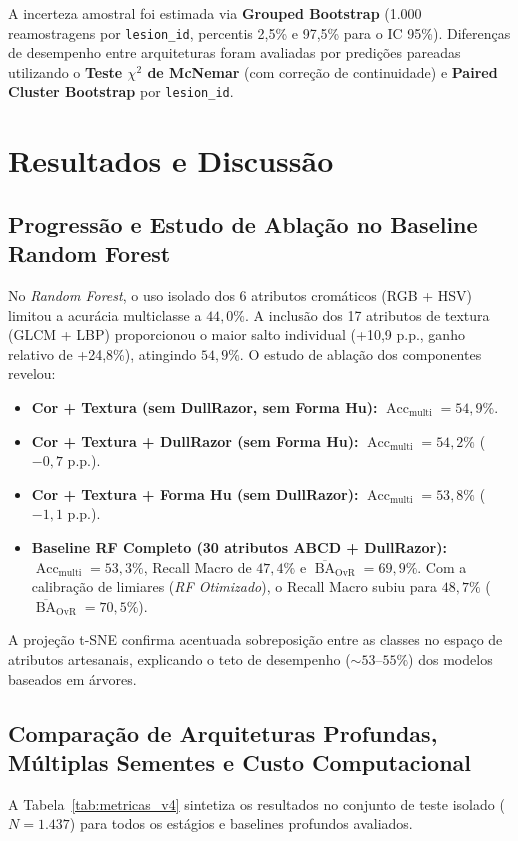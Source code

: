 \documentclass[12pt,a4paper]{article}
\begin{document}
A incerteza amostral foi estimada via \textbf{Grouped Bootstrap} (1.000 reamostragens por \texttt{lesion\_id}, percentis 2,5\% e 97,5\% para o IC 95\%). Diferenças de desempenho entre arquiteturas foram avaliadas por predições pareadas utilizando o \textbf{Teste $\chi^2$ de McNemar} (com correção de continuidade) e \textbf{Paired Cluster Bootstrap} por \texttt{lesion\_id}.

\section{Resultados e Discussão}

\subsection{Progressão e Estudo de Ablação no Baseline Random Forest}
No \textit{Random Forest}, o uso isolado dos 6 atributos cromáticos (RGB + HSV) limitou a acurácia multiclasse a $44{,}0\%$. A inclusão dos 17 atributos de textura (GLCM + LBP) proporcionou o maior salto individual (+10,9 p.p., ganho relativo de +24,8\%), atingindo $54{,}9\%$. O estudo de ablação dos componentes revelou:
\begin{itemize}
    \item \textbf{Cor + Textura (sem DullRazor, sem Forma Hu):} $\operatorname{Acc}_{\text{multi}} = 54{,}9\%$.
    \item \textbf{Cor + Textura + DullRazor (sem Forma Hu):} $\operatorname{Acc}_{\text{multi}} = 54{,}2\%$ ($-0{,}7$ p.p.).
    \item \textbf{Cor + Textura + Forma Hu (sem DullRazor):} $\operatorname{Acc}_{\text{multi}} = 53{,}8\%$ ($-1{,}1$ p.p.).
    \item \textbf{Baseline RF Completo (30 atributos ABCD + DullRazor):} $\operatorname{Acc}_{\text{multi}} = 53{,}3\%$, Recall Macro de $47{,}4\%$ e $\overline{\operatorname{BA}}_{\text{OvR}} = 69{,}9\%$. Com a calibração de limiares (\textit{RF Otimizado}), o Recall Macro subiu para $48{,}7\%$ ($\overline{\operatorname{BA}}_{\text{OvR}} = 70{,}5\%$).
\end{itemize}
A projeção t-SNE \cite{vandermaaten2008} confirma acentuada sobreposição entre as classes no espaço de atributos artesanais, explicando o teto de desempenho ($\sim 53\text{--}55\%$) dos modelos baseados em árvores.

\subsection{Comparação de Arquiteturas Profundas, Múltiplas Sementes e Custo Computacional}
A Tabela~\ref{tab:metricas_v4} sintetiza os resultados no conjunto de teste isolado ($N = 1.437$) para todos os estágios e baselines profundos avaliados.
\end{document}
